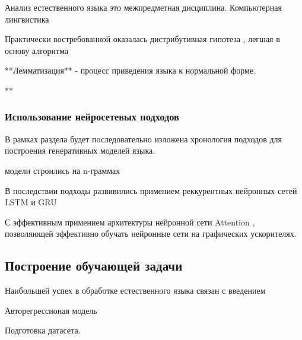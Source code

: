 \documentclass{mipt-thesis-bs}
\begin{document}
Анализ естественного языка это межпредметная дисциплина.
Компьютерная лингвистика

Практически востребованной оказалась дистрибутивная гипотеза ,
легшая в основу алгоритма \cite{NIPS2013_9aa42b31}


**Лемматизация** - процесс приведения языка к нормальной форме.

**


\subsubsection{Использование нейросетевых подходов}

В рамках раздела будет последовательно изложена хронология подходов
для построения генеративных моделей языка.

 модели строились на n-граммах \cite{heafield-2011-kenlm}

 


В последствии подходы развивились примением реккурентных нейронных сетей LSTM  и GRU



С эффективным примением архитектуры нейронной сети Attention \cite{NIPS2017_3f5ee243}, позволяющей эффективно обучать нейронные сети на графических ускорителях. 





\subsection{Построение обучающей задачи}







Наибольшей успех в обработке естественного языка связан с
введением 

Авторегрессионая модель

Подготовка датасета. 


\printbib
\end{document}
